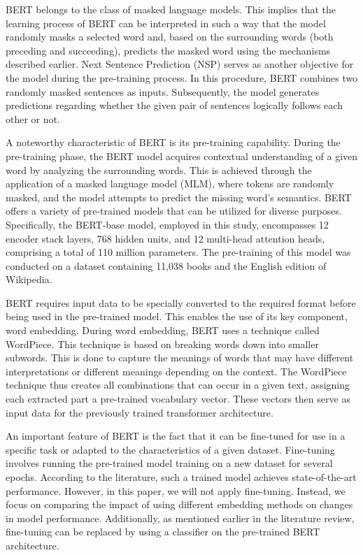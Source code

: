 BERT belongs to the class of masked language models. This implies that the learning process of BERT can be interpreted in such a way that the model randomly masks a selected word and, based on the surrounding words (both preceding and succeeding), predicts the masked word using the mechanisms described earlier. 
Next Sentence Prediction (NSP) serves as another objective for the model during the pre-training process. In this procedure, BERT combines two randomly masked sentences as inputs. Subsequently, the model generates predictions regarding whether the given pair of sentences logically follows each other or not.

A noteworthy characteristic of BERT is its pre-training capability. During the pre-training phase, the BERT model acquires contextual understanding of a given word by analyzing the surrounding words. This is achieved through the application of a masked language model (MLM), where tokens are randomly masked, and the model attempts to predict the missing word's semantics. BERT offers a variety of pre-trained models that can be utilized for diverse purposes. Specifically, the BERT-base model, employed in this study, encompasses 12 encoder stack layers, 768 hidden units, and 12 multi-head attention heads, comprising a total of 110 million parameters. The pre-training of this model was conducted on a dataset containing 11,038 books and the English edition of Wikipedia.

BERT requires input data to be specially converted to the required format before being used in the pre-trained model. This enables the use of its key component, word embedding. During word embedding, BERT uses a technique called WordPiece. This technique is based on breaking words down into smaller subwords. This is done to capture the meanings of words that may have different interpretations or different meanings depending on the context. The WordPiece technique thus creates all combinations that can occur in a given text, assigning each extracted part a pre-trained vocabulary vector. These vectors then serve as input data for the previously trained transformer architecture.

An important feature of BERT is the fact that it can be fine-tuned for use in a specific task or adapted to the characteristics of a given dataset. Fine-tuning involves running the pre-trained model training on a new dataset for several epochs. According to the literature, such a trained model achieves state-of-the-art performance. However, in this paper, we will not apply fine-tuning. Instead, we focus on comparing the impact of using different embedding methods on changes in model performance. Additionally, as mentioned earlier in the literature review, fine-tuning can be replaced by using a classifier on the pre-trained BERT architecture.

